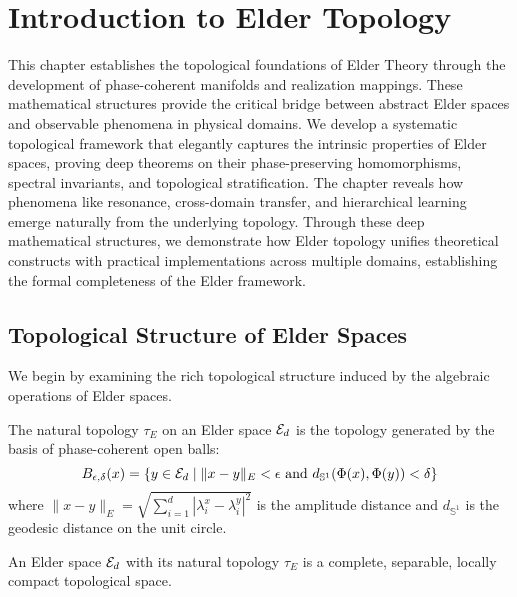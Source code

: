 \chapter{Introduction to Elder Topology}

\begin{chapterabstract}
This chapter establishes the topological foundations of Elder Theory through the development of phase-coherent manifolds and realization mappings. These mathematical structures provide the critical bridge between abstract Elder spaces and observable phenomena in physical domains. We develop a systematic topological framework that elegantly captures the intrinsic properties of Elder spaces, proving deep theorems on their phase-preserving homomorphisms, spectral invariants, and topological stratification. The chapter reveals how phenomena like resonance, cross-domain transfer, and hierarchical learning emerge naturally from the underlying topology. Through these deep mathematical structures, we demonstrate how Elder topology unifies theoretical constructs with practical implementations across multiple domains, establishing the formal completeness of the Elder framework.
\end{chapterabstract}

\section{Topological Structure of Elder Spaces}

We begin by examining the rich topological structure induced by the algebraic operations of Elder spaces.

\begin{definition}
The natural topology $\tau_E$ on an Elder space $\mathcal{E}_{d}$ is the topology generated by the basis of phase-coherent open balls:
\begin{equation}
B_{\epsilon,\delta}(x) = \{y \in \mathcal{E}_{d} \mid \|x - y\|_E < \epsilon \text{ and } d_{\mathbb{S}^1}(\Phi(x), \Phi(y)) < \delta\}
\end{equation}
where $\|x - y\|_E = \sqrt{\sum_{i=1}^{d}|\lambda_i^x - \lambda_i^y|^2}$ is the amplitude distance and $d_{\mathbb{S}^1}$ is the geodesic distance on the unit circle.
\end{definition}

\begin{theorem}
An Elder space $\mathcal{E}_{d}$ with its natural topology $\tau_E$ is a complete, separable, locally compact topological space.
\end{theorem}

